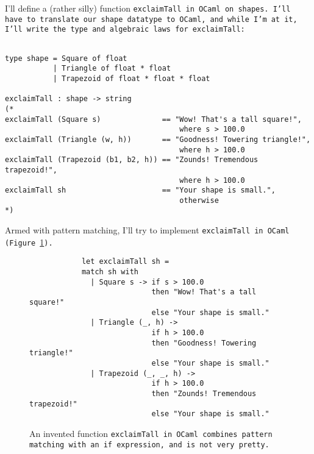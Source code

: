 \documentclass[manuscript,screen,review, 12pt, nonacm]{acmart}
\begin{document}
    I'll define a (rather silly) function \tt{exclaimTall} in OCaml on
    \tt{shape}s. I'll have to translate our \tt{shape} datatype to OCaml, and
    while I'm at it, I'll write the type and algebraic laws for
    \tt{exclaimTall}:

    \begin{minipage}[t]{\textwidth}        
        \centering 
        \begin{verbatim}

type shape = Square of float 
           | Triangle of float * float
           | Trapezoid of float * float * float

exclaimTall : shape -> string 
(*
exclaimTall (Square s)              == "Wow! That's a tall square!", 
                                        where s > 100.0
exclaimTall (Triangle (w, h))       == "Goodness! Towering triangle!",
                                        where h > 100.0
exclaimTall (Trapezoid (b1, b2, h)) == "Zounds! Tremendous trapezoid!", 
                                        where h > 100.0
exclaimTall sh                      == "Your shape is small.", 
                                        otherwise
*)
    \end{verbatim}
    \end{minipage}

    Armed with pattern matching, I'll try to implement \tt{exclaimTall} in OCaml
    (Figure~\ref{fig:ifexclaimtall}).

    \begin{figure}[ht]
        \begin{verbatim}
            let exclaimTall sh =
            match sh with 
              | Square s -> if s > 100.0 
                            then "Wow! That's a tall square!"
                            else "Your shape is small." 
              | Triangle (_, h) -> 
                            if h > 100.0 
                            then "Goodness! Towering triangle!"
                            else "Your shape is small." 
              | Trapezoid (_, _, h) -> 
                            if h > 100.0
                            then "Zounds! Tremendous trapezoid!"
                            else "Your shape is small." 
            \end{verbatim}    
        \caption{An invented function \tt{exclaimTall} in OCaml combines pattern
        matching with an \tt{if} expression, and is not very pretty.}   
        \label{fig:ifexclaimtall}
    \end{figure}
    
\end{document}
